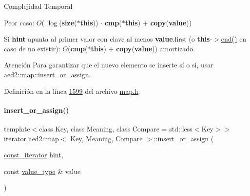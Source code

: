 \begin{DoxyDescription}
\item[Complejidad Temporal]
\begin{DoxyItemize}
\item Peor caso\+: $O$( $\log$({\bfseries size}({\bfseries $\ast$this})) $\cdot$ {\bfseries cmp}({\bfseries $\ast$this}) $+$ {\bfseries copy}({\bfseries value}))
\item Si {\bfseries hint} apunta al primer valor con clave al menos {\bfseries value}.first (o {\bfseries this}-\/$>$\hyperlink{classaed2_1_1map_a76023e6a56cb625513e1b5ea028bf983_a76023e6a56cb625513e1b5ea028bf983}{end()} en caso de no existir)\+: $O$({\bfseries cmp}({\bfseries $\ast$this}) $+$ {\bfseries copy}({\bfseries value})) amortizado. 
\end{DoxyItemize}
\end{DoxyDescription}

\begin{DoxyAttention}{Atención}
Para garantizar que el nuevo elemento se inserte sí o sí, usar \hyperlink{classaed2_1_1map_a2ef6723c183916276b0afc4a4c721475_a2ef6723c183916276b0afc4a4c721475}{aed2\+::map\+::insert\+\_\+or\+\_\+assign}. 
\end{DoxyAttention}


Definición en la línea \hyperlink{map_8h_source_l01599}{1599} del archivo \hyperlink{map_8h_source}{map.\+h}.

\mbox{\label{classaed2_1_1map_a2ef6723c183916276b0afc4a4c721475_a2ef6723c183916276b0afc4a4c721475}} 
\paragraph{\texorpdfstring{insert\+\_\+or\+\_\+assign()}{insert\_or\_assign()}\hspace{0.1cm}{\footnotesize\ttfamily [1/2]}}
{\footnotesize\ttfamily template$<$class Key, class Meaning, class Compare = std\+::less$<$\+Key$>$$>$ \\
\hyperlink{classaed2_1_1map_1_1iterator}{iterator} \hyperlink{classaed2_1_1map}{aed2\+::map}$<$ Key, Meaning, Compare $>$\+::insert\+\_\+or\+\_\+assign (\begin{DoxyParamCaption}\item[{\hyperlink{classaed2_1_1map_1_1const__iterator}{const\+\_\+iterator}}]{hint,  }\item[{const \hyperlink{classaed2_1_1map_a719db98e0ff9a837610f76be33264680_a719db98e0ff9a837610f76be33264680}{value\+\_\+type} \&}]{value }\end{DoxyParamCaption})\hspace{0.3cm}{\ttfamily [inline]}}



